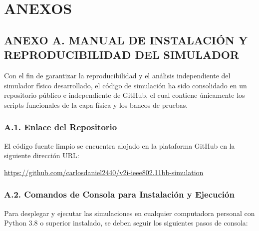 \clearpage
{}
\setcounter{page}{1}

\chapter*{ANEXOS}

\section*{ANEXO A. MANUAL DE INSTALACIÓN Y REPRODUCIBILIDAD DEL SIMULADOR}
\label{anexo:manual_simulador}

Con el fin de garantizar la reproducibilidad y el análisis independiente del simulador físico desarrollado, el código de simulación ha sido consolidado en un repositorio público e independiente de GitHub, el cual contiene únicamente los scripts funcionales de la capa física y los bancos de pruebas.

\subsection*{A.1. Enlace del Repositorio}
El código fuente limpio se encuentra alojado en la plataforma GitHub en la siguiente dirección URL:
\begin{center}
    \url{https://github.com/carlosdaniel2440/v2i-ieee802.11bb-simulation}
\end{center}

\subsection*{A.2. Comandos de Consola para Instalación y Ejecución}
Para desplegar y ejecutar las simulaciones en cualquier computadora personal con Python 3.8 o superior instalado, se deben seguir los siguientes pasos de consola:

